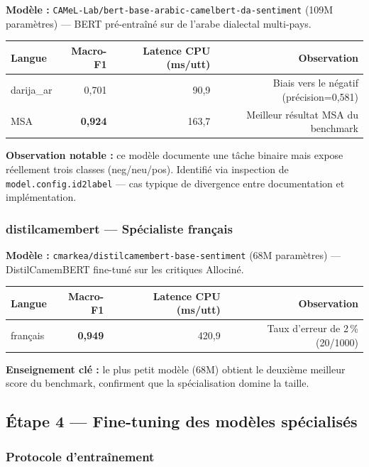 \documentclass[12pt, a4paper]{article}
\begin{document}
\textbf{Modèle :} \texttt{CAMeL-Lab/bert-base-arabic-camelbert-da-sentiment}
(109M paramètres) — BERT pré-entraîné sur de l'arabe dialectal multi-pays.

\begin{center}
\begin{tabular}{lrrr}
\toprule
\textbf{Langue} & \textbf{Macro-F1} & \textbf{Latence CPU (ms/utt)} & \textbf{Observation} \\
\midrule
darija\_ar & 0{,}701 & 90{,}9 & Biais vers le négatif (précision=0,581) \\
MSA        & \textbf{0{,}924} & 163{,}7 & Meilleur résultat MSA du benchmark \\
\bottomrule
\end{tabular}
\end{center}

\textbf{Observation notable :} ce modèle documente une tâche binaire mais
expose réellement trois classes (neg/neu/pos). Identifié via inspection de
\texttt{model.config.id2label} — cas typique de divergence entre documentation
et implémentation.

\subsubsection{distilcamembert — Spécialiste français}

\textbf{Modèle :} \texttt{cmarkea/distilcamembert-base-sentiment}
(68M paramètres) — DistilCamemBERT fine-tuné sur les critiques Allociné.

\begin{center}
\begin{tabular}{lrrr}
\toprule
\textbf{Langue} & \textbf{Macro-F1} & \textbf{Latence CPU (ms/utt)} & \textbf{Observation} \\
\midrule
français & \textbf{0{,}949} & 420{,}9 & Taux d'erreur de 2\,\% (20/1000) \\
\bottomrule
\end{tabular}
\end{center}

\textbf{Enseignement clé :} le plus petit modèle (68M) obtient le deuxième
meilleur score du benchmark, confirment que la spécialisation domine la taille.

\subsection{Étape 4 — Fine-tuning des modèles spécialisés}

\subsubsection{Protocole d'entraînement}
\end{document}
